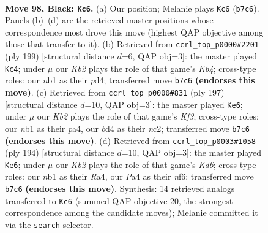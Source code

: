\documentclass[11pt]{article}
\begin{document}
\clearpage

\begin{figure}[p]\centering
\begin{subfigure}{0.46\textwidth}\centering
\resizebox{\linewidth}{!}{%
\newchessgame
\chessboard[
  setfen={8/1k6/8/8/p1pB2b1/8/5K2/1N6 b - - 51 98},
  showmover=false,
  pgfstyle=straightmove, color=movearrow, markmove={b7-c6}
]}
\caption{}
\end{subfigure}\hfill
\begin{subfigure}{0.46\textwidth}\centering
\resizebox{\linewidth}{!}{%
\newchessgame
\chessboard[
  setfen={8/4B3/8/1k1p2K1/3P4/8/8/1b6 b - - 91 100},
  showmover=false,
  pgfstyle=straightmove, color=movearrow, markmove={b5-c4}
]}
\caption{}
\end{subfigure}
\\[4pt]
\begin{subfigure}{0.46\textwidth}\centering
\resizebox{\linewidth}{!}{%
\newchessgame
\chessboard[
  setfen={8/8/5k2/p7/P2K4/8/2N1p3/8 b - - 65 99},
  showmover=false,
  pgfstyle=straightmove, color=movearrow, markmove={f6-e6}
]}
\caption{}
\end{subfigure}\hfill
\begin{subfigure}{0.46\textwidth}\centering
\resizebox{\linewidth}{!}{%
\newchessgame
\chessboard[
  setfen={8/8/3K1n2/8/R7/2k5/8/4bB2 w - - 35 98},
  showmover=false,
  pgfstyle=straightmove, color=movearrow, markmove={d6-e6}
]}
\caption{}
\end{subfigure}
\caption{\textbf{Move 98, Black: \texttt{Kc6}.} (a) Our position; Melanie plays \texttt{Kc6} (\texttt{b7c6}). Panels (b)--(d) are the retrieved master positions whose correspondence most drove this move (highest QAP objective among those that transfer to it). (b) Retrieved from \texttt{ccrl\_top\_p0000\#2201} (ply 199) [structural distance $d$=6, QAP obj=3]: the master played \texttt{Kc4}; under $\mu$ our \emph{Kb2} plays the role of that game's \emph{Kb4}; cross-type roles: our \emph{n}b1 as their \emph{p}d4; transferred move \texttt{b7c6} \textbf{(endorses this move)}. (c) Retrieved from \texttt{ccrl\_top\_p0000\#831} (ply 197) [structural distance $d$=10, QAP obj=3]: the master played \texttt{Ke6}; under $\mu$ our \emph{Kb2} plays the role of that game's \emph{Kf3}; cross-type roles: our \emph{n}b1 as their \emph{p}a4, our \emph{b}d4 as their \emph{n}c2; transferred move \texttt{b7c6} \textbf{(endorses this move)}. (d) Retrieved from \texttt{ccrl\_top\_p0003\#1058} (ply 194) [structural distance $d$=10, QAP obj=3]: the master played \texttt{Ke6}; under $\mu$ our \emph{Kb2} plays the role of that game's \emph{Kd6}; cross-type roles: our \emph{n}b1 as their \emph{R}a4, our \emph{P}a4 as their \emph{n}f6; transferred move \texttt{b7c6} \textbf{(endorses this move)}. Synthesis: 14 retrieved analogs transferred to \texttt{Kc6} (summed QAP objective 20, the strongest correspondence among the candidate moves); Melanie committed it via the \texttt{search} selector.}
\label{fig:thought-m195}
\end{figure}
\end{document}
